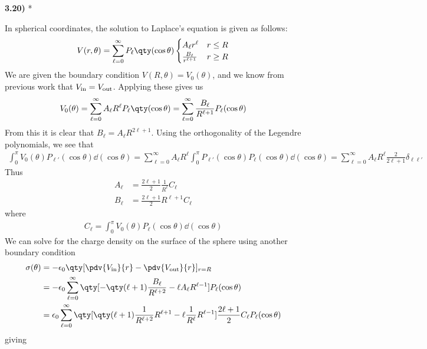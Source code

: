 \documentclass[12pt,a4paper]{article}
\newcommand{\prob}[2]{\textbf{#1)} #2}
\begin{document}
\prob{3.20}{*}

In spherical coordinates, the solution to Laplace's equation is given as follows:
\begin{align*}
V(r,\theta) = \sum_{\ell = 0}^{\infty} P_{\ell}\qty(\cos{\theta})\begin{cases}
A_{\ell}r^{\ell} & r \leq R \\
\frac{B_{\ell}}{r^{\ell + 1}} & r \geq R
\end{cases}
\end{align*}
We are given the boundary condition $V(R,\theta) = V_{0}(\theta)$, and we know from previous work that $V_{\rm in} = V_{\rm out}$. Applying these gives us
\begin{align*}
V_{0}(\theta) = \sum_{\ell = 0}^{\infty} A_{\ell}R^{\ell}P_{\ell}\qty(\cos{\theta}) = \sum_{\ell = 0}^{\infty} \frac{B_{\ell}}{R^{\ell + 1}}P_{\ell}(\cos{\theta})
\end{align*}
From this it is clear that $B_{\ell} = A_{\ell}R^{2\ell + 1}$. Using the orthogonality of the Legendre polynomials, we see that
\begin{align*}
\int_{0}^{\pi} V_{0}(\theta)P_{\ell'}(\cos{\theta}) \dd{(\cos{\theta})} = \sum_{\ell = 0}^{\infty} A_{\ell}R^{\ell}\int_{0}^{\pi} P_{\ell'}(\cos{\theta})P_{\ell}(\cos{\theta}) \dd{(\cos{\theta})} = \sum_{\ell = 0}^{\infty} A_{\ell}R^{\ell} \frac{2}{2\ell + 1}\delta_{\ell\ell'}
\end{align*}
Thus
\begin{align*}
A_{\ell} &= \frac{2\ell + 1}{2}\frac{1}{R^{\ell}}C_{\ell} \\
B_{\ell} &= \frac{2\ell + 1}{2}R^{\ell + 1}C_{\ell}
\end{align*}
where
\begin{align*}
C_{\ell} = \int_{0}^{\pi} V_0(\theta)P_{\ell}(\cos{\theta}) \dd{(\cos{\theta})}
\end{align*}
We can solve for the charge density on the surface of the sphere using another boundary condition
\begin{align*}
\sigma(\theta) &= -\epsilon_0\qty[\pdv{V_{\rm in}}{r} - \pdv{V_{\rm out}}{r}]_{r=R} \\
 &= -\epsilon_0\sum_{\ell = 0}^{\infty} \qty[-\qty(\ell + 1)\frac{B_{\ell}}{R^{\ell + 2}} - \ell A_{\ell}R^{\ell - 1}]P_{\ell}(\cos{\theta}) \\
&= \epsilon_0\sum_{\ell = 0}^{\infty} \qty[\qty(\ell + 1)\frac{1}{R^{\ell + 2}}R^{\ell+1} - \ell\frac{1}{R^{\ell}}R^{\ell - 1}]\frac{2\ell + 1}{2}C_{\ell}P_{\ell}(\cos{\theta}) \\
\end{align*}
giving
\end{document}
